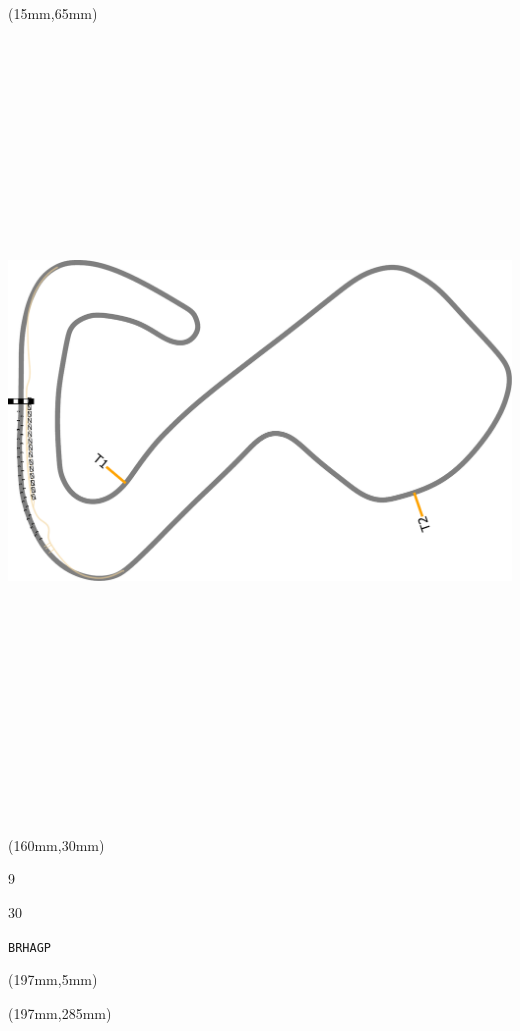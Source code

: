 \begin{textblock*}{185mm}(15mm,65mm)%
\centering
\mbox{\includegraphics[width=185mm,height=210mm,keepaspectratio]{PT/BRHAGP.pdf}}
\end{textblock*}
\begin{textblock*}{40mm}(160mm,30mm)%
\Large
\par{} 
\par9 
\par30 
\par\hfill\tiny\tt BRHAGP\\
\end{textblock*}
\begin{textblock*}{20mm}(197mm,5mm)%
\fbox{\thepage}
\label{BRHAGP}
\end{textblock*}
\begin{textblock*}{20mm}(197mm,285mm)%
\fbox{\thepage}
\end{textblock*}

